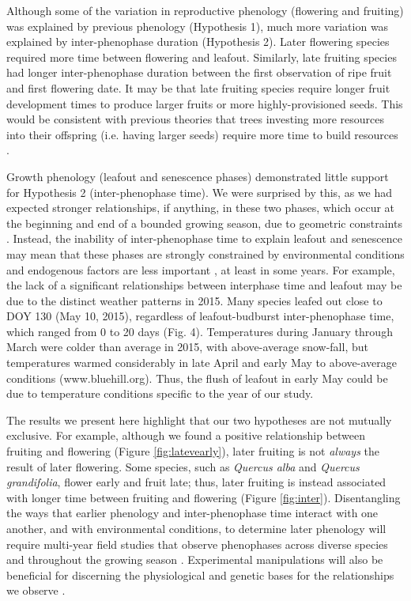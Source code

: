 \documentclass{article}
\begin{document}
\par Although some of the variation in reproductive phenology (flowering and fruiting) was explained by previous phenology (Hypothesis 1), much more variation was explained by inter-phenophase duration (Hypothesis 2). Later flowering species required more time between flowering and leafout. Similarly, late fruiting species had longer inter-phenophase duration between the first observation of ripe fruit and first flowering date. It may be that late fruiting species require longer fruit development times to produce larger fruits or more highly-provisioned seeds. This would be consistent with previous theories that trees investing more resources into their offspring (i.e. having larger seeds) require more time to build resources \citep{bolmgren2008,sun2011}.

\par Growth phenology (leafout and senescence phases) demonstrated little support for Hypothesis 2 (inter-phenophase time). We were surprised by this, as we had expected stronger relationships, if anything, in these two phases, which occur at the beginning and end of a bounded growing season, due to geometric constraints \citep{letten2013}. %
Instead, the inability of inter-phenophase time to explain leafout and senescence may mean that these phases are strongly constrained by environmental conditions and endogenous factors are less important \citep{fenner1998}, at least in some years. For example, the lack of a significant relationships between interphase time and leafout may be due to the distinct weather patterns in 2015. Many species leafed out close to DOY 130 (May 10, 2015), regardless of leafout-budburst inter-phenophase time, which ranged from 0 to 20 days (Fig. 4). Temperatures during January through March were colder than average in 2015, with above-average snow-fall, but temperatures warmed considerably in late April and early May to above-average conditions (www.bluehill.org). Thus, the flush of leafout in early May could be due to temperature conditions specific to the year of our study. 


\par The results we present here highlight that our two hypotheses are not mutually exclusive. For example, although we found a positive relationship between fruiting and flowering (Figure \ref{fig:latevearly}), later fruiting is not \textit{always} the result of later flowering. Some species, such as \textit{Quercus alba} and \textit{Quercus grandifolia}, flower early and fruit late; thus, later fruiting is instead associated with longer time between fruiting and flowering (Figure \ref{fig:inter}). Disentangling the ways that earlier phenology and inter-phenophase time interact with one another, and with environmental conditions, to determine later phenology will require multi-year field studies that observe phenophases across diverse species and throughout the growing season \citep[e.g.][]{elmendorf2016}. Experimental manipulations will also be beneficial for discerning the physiological and genetic bases for the relationships we observe \citep{flint1974}.
\end{document}
